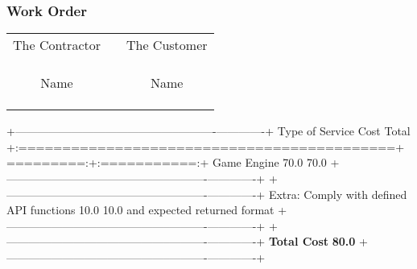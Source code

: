 \documentclass[
]{article}
\author{}
\date{}
\begin{document}
\hypertarget{work-order}{%
\subsubsection{Work Order}\label{work-order}}

\begin{table}[h]
\begin{tabular}{ccc}
The Contractor & \hspace{3cm} & The Customer \\
& & \\
& & \\
\hrulefill & \hspace{3cm} & \hrulefill \\
%
Name & \hspace{3cm} & Name \\
& & \\
& & \\
\hrulefill & \hspace{3cm} & \hrulefill \\

\end{tabular}
\end{table}
\vspace{1cm}

+--------------------------------------------\textbar----------\textbar-------------+
\textbar{} Type of Service \textbar{} Cost \textbar{} Total \textbar{}
+:===========================================+=========:+:===========:+
\textbar{} Game Engine \textbar{} 70.0 \textbar{} 70.0 \textbar{}
\textbar{} \textbar{} \textbar{} \textbar{}
+--------------------------------------------\textbar----------\textbar-------------+
\textbar{} \textbar{} \textbar{} \textbar{}
+--------------------------------------------\textbar----------\textbar-------------+
\textbar{} Extra: Comply with defined API functions \textbar{} 10.0
\textbar{} 10.0 \textbar{} \textbar{} and expected returned format
\textbar{} \textbar{} \textbar{}
+--------------------------------------------\textbar----------\textbar-------------+
\textbar{} \textbar{} \textbar{} \textbar{}
+--------------------------------------------\textbar----------\textbar-------------+
\textbar{} \textbf{Total Cost} \textbar{} \textbar{} \textbf{80.0}
\textbar{}
+--------------------------------------------\textbar----------\textbar-------------+
\end{document}
